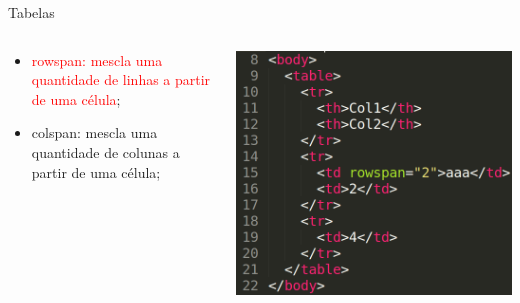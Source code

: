 \documentclass{beamer}
\begin{document}
\begin{frame}{Tabelas}
    \begin{columns}
    \begin{column}{0.5 \textwidth}
      \small
     \begin{itemize}
       \item \textcolor{red}{rowspan: mescla uma quantidade de linhas a partir 
	 de uma célula};
      \item colspan: mescla uma quantidade de colunas a partir de uma 
célula;
     \end{itemize}
    \end{column}
    
    \begin{column}{0.5\textwidth}
     \includegraphics[height=0.5\paperheight]{fig/aula2/aula4_5.png}
    \end{column}
  \end{columns}
\end{frame}
\end{document}
